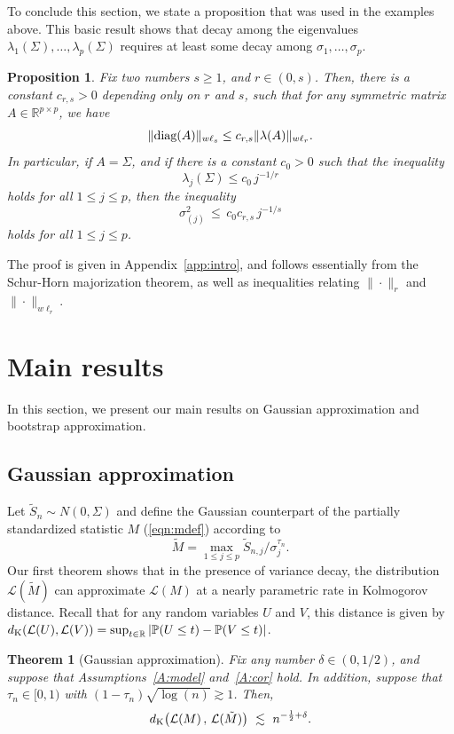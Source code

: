 \documentclass[aos,preprint]{imsart}
\numberwithin{equation}{section}
\theoremstyle{plain}
\newtheorem{theorem}{Theorem}[section]
\newtheorem{proposition}{Proposition}[section]
\newcommand{\R}{\mathbb{R}}
\newcommand{\dK}{d_{\textup{K}}}
\renewcommand{\P}{\mathbb{P}}
\renewcommand{\L}{\mathcal{L}}
\newcommand{\1}{{\bf{1}}}
\newcommand{\0}{\mathbf{0}}
\begin{document}
To conclude this section, we state a proposition that was used in the examples above. This basic result shows that decay among the eigenvalues $\lambda_1(\Sigma),\dots,\lambda_p(\Sigma)$ requires at least some decay among $\sigma_1,\dots,\sigma_p$. 
%
%
%
%
%
\begin{proposition}\label{PROP:DECAY}
Fix two numbers $s\geq 1$, and $r\in(0,s)$. Then, there is a constant $c_{r,s}>0$ depending only on $r$ and $s$, such that for any symmetric matrix $A\in\R^{p\times p}$, we have
$$\|\textup{diag}(A) \|_{w\ell_s}\leq c_{r,s} \| \lambda(A)\|_{w\ell_r}.$$
In particular, if $A=\Sigma$, and if there is a constant $c_0>0$ such that the inequality
$$\lambda_j(\Sigma)\leq c_0\, j^{-1/r}$$
holds for all $1\leq j\leq p$,
%
%
then the inequality
$$\sigma_{(j)}^2 \, \leq \, c_0c_{r,s} \, j^{-1/s}$$
holds for all $1\leq j\leq p$.
\end{proposition}
%
\noindent The proof is given in Appendix~\ref{app:intro}, and follows essentially from the Schur-Horn majorization theorem, as well as inequalities relating $\|\cdot\|_r$ and $\|\cdot\|_{w\ell_r}$.




\section{Main results}\label{sec:main}


In this section, we present our main results on Gaussian approximation and bootstrap approximation.

\subsection{Gaussian approximation}


Let $\tilde S_n\sim N(0,\Sigma)$ and define 
the Gaussian counterpart of the partially standardized statistic $M$  (\ref{eqn:mdef}) according to 
\begin{equation}\label{eqn:Mtildedef}
 \tilde{M}=\max_{1\leq j\leq p} \tilde{S}_{n,j}/\sigma_j^{\tau_n}.
\end{equation}
%
%
%
Our first theorem shows that in the presence of variance decay, the distribution $\mathcal{L}(\tilde M)$ can approximate $\mathcal{L}(M)$ at a nearly parametric rate in Kolmogorov distance. Recall that for any random variables $U$ and $V$, this distance is given by $\dK(\L(U),\L(V))=\sup_{t\in\R}|\P(U\leq t)-\P(V\leq t)|$.

%
%
%
%
%
%
%
\begin{theorem}[Gaussian approximation]\label{THM:G}
Fix any number $\delta\in(0,1/2)$, and suppose that Assumptions~\ref{A:model} and~\ref{A:cor} hold. In addition, suppose that $\tau_n\in [0,1)$ with $(1-\tau_n)\sqrt{\log(n)}\gtrsim 1$. Then, 
\begin{equation}\label{eqn:thmG}
d_{\textup{K}}\big(\mathcal{L}(M) \, , \, \mathcal{L}(\tilde{M})\big) \ \lesssim  \  n^{-\frac 12+\delta}.
\end{equation}
%
\end{theorem}
\end{document}
